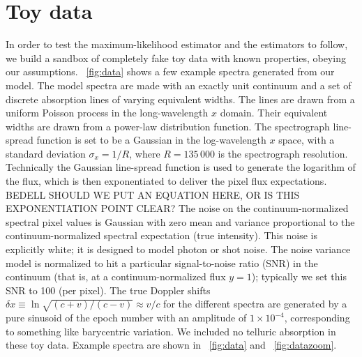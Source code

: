\documentclass[modern]{aastex631}
\newcommand{\figref}[1]{\figurename~\ref{#1}}
\begin{document}
\section{Toy data}\label{sec:data}

In order to test the maximum-likelihood estimator and the estimators to follow, we build a sandbox of completely fake toy data with known properties, obeying our assumptions.
\figref{fig:data} shows a few example spectra generated from our model.
The model spectra are made with an exactly unit continuum and a set of discrete absorption lines of varying equivalent widths.
The lines are drawn from a uniform Poisson process in the long-wavelength $x$ domain.
Their equivalent widths are drawn from a power-law distribution function.
The spectrograph line-spread function is set to be a Gaussian in the log-wavelength $x$ space, with a standard deviation $\sigma_x=1/R$, where $R=135\,000$ is the spectrograph resolution.
Technically the Gaussian line-spread function is used to generate the logarithm of the flux, which is then exponentiated to deliver the pixel flux expectations.
BEDELL SHOULD WE PUT AN EQUATION HERE, OR IS THIS EXPONENTIATION POINT CLEAR?
The noise on the continuum-normalized spectral pixel values is Gaussian with zero mean and variance proportional to the continuum-normalized spectral expectation (true intensity).
This noise is explicitly white; it is designed to model photon or shot noise.
The noise variance model is normalized to hit a particular signal-to-noise ratio (SNR) in the continuum (that is, at a continuum-normalized flux $y=1$); typically we set this SNR to 100 (per pixel).
The true Doppler shifts $\delta x\equiv\ln\sqrt{(c+v)/(c-v)}\approx v/c$ for the different spectra are generated by a pure sinusoid of the epoch number with an amplitude of $1\times10^{-4}$, corresponding to something like barycentric variation.
We included no telluric absorption in these toy data.
Example spectra are shown in \figref{fig:data} and \figref{fig:datazoom}.
\end{document}
